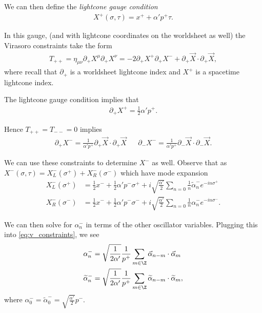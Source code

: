 We can then define the \emph{lightcone gauge condition}
\begin{align}
    X^{+}\left( \sigma, \tau \right) = x^{+} + \alpha' p^{+} \tau
.\end{align}

In this gauge, (and with lightcone coordinates on the worldsheet as well) the Virasoro constraints take the form
\begin{align}
    T_{++} = \eta_{\mu \nu} \partial_+ X^{\mu} \partial_+ X^{\nu} = -2 \partial_+ X^{+} \partial_+ X^{-} + \partial_+ \vec{X} \cdot \partial_+ \vec{X}
,\end{align}
where recall that $\partial_+$ is a worldsheet lightcone index and $X^{+}$ is a spacetime lightcone index.

The lightcone gauge condition implies that
\begin{align}
    \partial_+ X^{+} = \frac{1}{2} \alpha' p^{+}
.\end{align}

Hence $T_{++} = T_{--} = 0$ implies 
\begin{align}\label{eq:v_constraints}
    \partial_+ X^{-} = \frac{1}{\alpha' p^{+}} \partial_+ \vec{X} \cdot \partial_+ \vec{X} && \partial_- X^{-} = \frac{1}{\alpha' p^{+}} \partial_- \vec{X} \cdot \partial_- \vec{X}
.\end{align}

We can use these constraints to determine $X^{-}$ as well. Observe that as $X^{-} \left( \sigma, \tau \right) = X^{-}_L \left( \sigma^{+} \right) + X_R^{-}\left( \sigma^{-} \right) $ which have mode expansion
\begin{align}
    X^{-}_L \left( \sigma^{+} \right) &= \frac{1}{2} x^{-} + \frac{1}{2}\alpha' p^{-} \sigma^{+} + i \sqrt{\frac{\alpha'}{2}} \sum_{n=0}^{} \frac{1}{n} \widetilde{\alpha}^{-}_n e^{-i n \sigma^{+}}  \\ 
    X^{-}_R \left( \sigma^{-} \right) &= \frac{1}{2} x^{-} + \frac{1}{2}\alpha' p^{-} \sigma^{-} + i \sqrt{\frac{\alpha'}{2}} \sum_{n=0}^{} \frac{1}{n} \alpha^{-}_n e^{-i n \sigma^{-}} 
.\end{align}

We can then solve for $\alpha_n^{-}$ in terms of the other oscillator variables. Plugging this into \cref{eq:v_constraints}, we see
\begin{align}
    \alpha^{-}_n &= \sqrt{\frac{1}{2\alpha'}}  \frac{1}{p^{+}} \sum_{m \in \Z}^{} \vec{\alpha}_{n-m} \cdot \vec{\alpha}_m \\
    \widetilde{\alpha}_n^{-} &= \sqrt{\frac{1}{2\alpha'}} \frac{1}{p^{+}} \sum_{m \in \Z}^{} \widetilde{\alpha}_{n-m} \cdot \widetilde{\alpha}_{m} 
,\end{align}
where $\alpha^{-}_0  = \widetilde{\alpha}_0^{-} = \sqrt{\frac{\alpha'}{2}}  p^{-}$.

